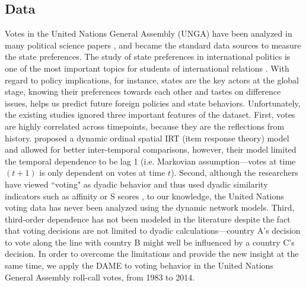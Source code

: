 \documentclass[a4paper]{article}
\begin{document}
\subsection{Data}\label{subsec: data processing}
Votes in the United Nations General Assembly (UNGA) have been analyzed in many political science papers \citep{voeten2000clashes,voeten2004resisting,bearce2007intergovernmental,mattes2015leadership,bailey2017estimating}, and became the standard data sources to measure the state preferences. The study of state preferences in international politics is one of the most important topics for students of international relations \citep{wendt_1994}. With regard to policy implications, for instance, states are the key actors at the global stage, knowing their preferences towards each other and tastes on difference issues, helps us predict future foreign policies and state behaviors. 
Unfortunately, the existing studies ignored three important features of the dataset. First, votes are highly correlated across timepoints, because they are the reflections from history. \cite{bailey2017estimating} proposed a dynamic ordinal spatial IRT (item response theory) model and allowed for better inter-temporal comparisons, however, their model limited the temporal dependence to be lag 1 (i.e. Markovian assumption---votes at time $(t+1)$ is only dependent on votes at time $t$). Second, although the researchers have viewed ``voting" as dyadic behavior and thus used dyadic similarity indicators such as affinity or S scores \citep{gartzke1998kant,signorino1999tau}, to our knowledge, the United Nations voting data has never been analyzed using the dynamic network models. Third, third-order dependence has not been modeled in the literature despite the fact that voting decisions are not limited to dyadic calculations---country A's decision to vote along the line with country B might well be influenced by a country C's decision. In order to overcome the limitations and provide the new insight at the same time, we apply the DAME to voting behavior in the United Nations General Assembly roll-call votes, from 1983 to 2014.\\ \newline
\end{document}
